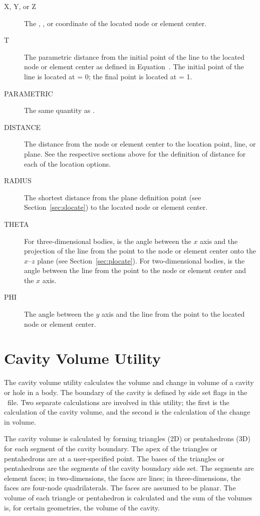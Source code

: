 \def\descriptionlabel #1{\sf #1:\hfil}
\begin{description}
\item[X, Y, {\rm or} Z] The , , or  coordinate
of the located node or element center.
\item[T] The parametric distance from the initial point of the line to
the located node or element center as defined in
Equation~.  The initial point of the line is located at
 = 0; the final point is located at  = 1.
\item[PARAMETRIC] The same quantity as .
\item[DISTANCE] The distance from the node or element center to the
location point, line, or plane.  See the respective sections above for
the definition of distance for each of the location options.
\item[RADIUS] The shortest distance from the plane definition point (see
Section~\ref{sec:slocate}) to the located node or element center. 
\item[THETA] For three-dimensional bodies,  is the angle
between the $x$ axis and the projection of the line from the point to
the node or element center onto the $x$--$z$ plane (see
Section~\ref{sec:plocate}).  For two-dimensional bodies,  is
the angle between the line from the point to the node or element center
and the $x$ axis. 
\item[PHI] The angle between the $y$ axis and the line from the point to
the located node or element center.
\end{description}

\section{Cavity Volume Utility}\label{sec:cavity}
The cavity volume utility calculates the volume and change in volume of
a cavity or hole in a body.  The boundary of the cavity is defined by
side set flags in the \exo\ file.  Two separate calculations are
involved in this utility; the first is the calculation of the
cavity volume, and the second is the calculation of the change in
volume.  

The cavity volume is calculated by forming triangles (2D) or
pentahedrons (3D) for each segment of the cavity boundary.  The apex of
the triangles or pentahedrons are at a user-specified point. The bases
of the triangles or pentahedrons are the segments of the cavity boundary
side set.  The segments are element faces; in two-dimensions, the faces
are lines; in three-dimensions, the faces are four-node quadrilaterals.
The faces are assumed to be planar.  The volume of each triangle or
pentahedron is calculated and the sum of the volumes is, for certain
geometries, the volume of the cavity. 

